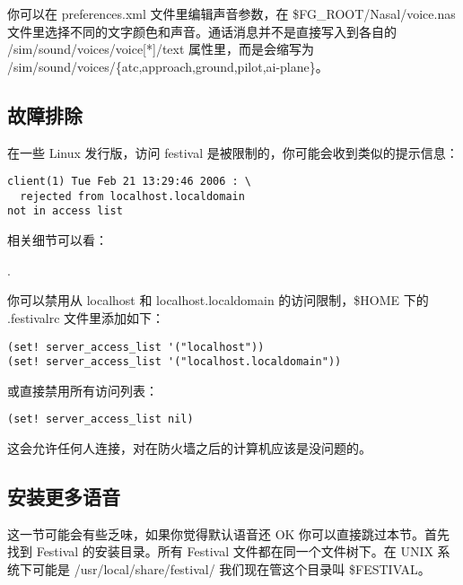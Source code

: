你可以在 preferences.xml 文件里编辑声音参数，在 \$FG\_ROOT/Nasal/voice.nas 文件里选择不同的文字颜色和声音。通话消息并不是直接写入到各自的 /sim/sound/voices/voice[*]/text 属性里，而是会缩写为\\ /sim/sound/voices/\{atc,approach,ground,pilot,ai-plane\}。

\subsection{故障排除}

在一些 Linux 发行版，访问 festival 是被限制的，你可能会收到类似的提示信息：

\begin{verbatim}
client(1) Tue Feb 21 13:29:46 2006 : \
  rejected from localhost.localdomain
not in access list
\end{verbatim}

相关细节可以看：

.

你可以禁用从 localhost 和 localhost.localdomain 的访问限制，\$HOME 下的 .festivalrc 文件里添加如下：

\begin{verbatim}
(set! server_access_list '("localhost"))
(set! server_access_list '("localhost.localdomain"))
\end{verbatim}

或直接禁用所有访问列表：

\begin{verbatim}
(set! server_access_list nil)
\end{verbatim}

这会允许任何人连接，对在防火墙之后的计算机应该是没问题的。

\subsection{安装更多语音}

这一节可能会有些乏味，如果你觉得默认语音还 OK 你可以直接跳过本节。首先找到 Festival 的安装目录。所有 Festival 文件都在同一个文件树下。在 UNIX 系统下可能是 /usr/local/share/festival/ 我们现在管这个目录叫 \$FESTIVAL。

